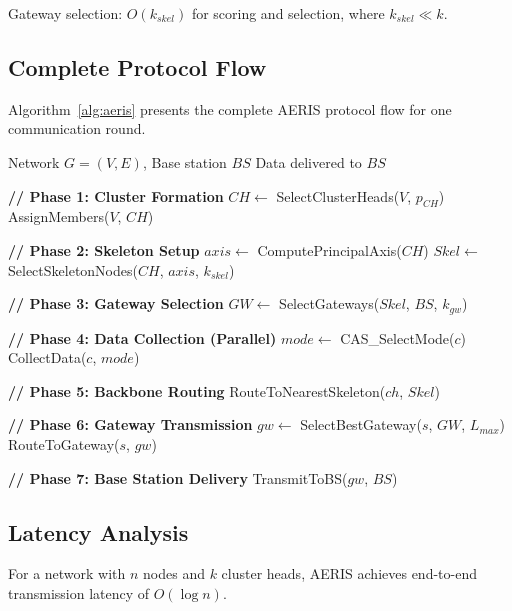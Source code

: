 Gateway selection: $O(k_{skel})$ for scoring and selection, where
$k_{skel} \ll k$.

\subsection{Complete Protocol Flow}

Algorithm~\ref{alg:aeris} presents the complete AERIS protocol flow
for one communication round.

\begin{algorithm}[htbp]
\caption{AERIS Protocol - One Round}
\label{alg:aeris}
\begin{algorithmic}[1]
\REQUIRE Network $G = (V, E)$, Base station $BS$
\ENSURE Data delivered to $BS$

\STATE \textbf{// Phase 1: Cluster Formation}
\STATE $CH \leftarrow$ SelectClusterHeads($V$, $p_{CH}$)
\STATE AssignMembers($V$, $CH$)

\STATE \textbf{// Phase 2: Skeleton Setup}
\STATE $axis \leftarrow$ ComputePrincipalAxis($CH$)
\STATE $Skel \leftarrow$ SelectSkeletonNodes($CH$, $axis$, $k_{skel}$)

\STATE \textbf{// Phase 3: Gateway Selection}
\STATE $GW \leftarrow$ SelectGateways($Skel$, $BS$, $k_{gw}$)

\STATE \textbf{// Phase 4: Data Collection (Parallel)}
    \STATE $mode \leftarrow$ CAS\_SelectMode($c$)
    \STATE CollectData($c$, $mode$)
\ENDFOR

\STATE \textbf{// Phase 5: Backbone Routing}
    \STATE RouteToNearestSkeleton($ch$, $Skel$)
\ENDFOR

\STATE \textbf{// Phase 6: Gateway Transmission}
    \STATE $gw \leftarrow$ SelectBestGateway($s$, $GW$, $L_{max}$)
    \STATE RouteToGateway($s$, $gw$)
\ENDFOR

\STATE \textbf{// Phase 7: Base Station Delivery}
    \STATE TransmitToBS($gw$, $BS$)
\ENDFOR

\end{algorithmic}
\end{algorithm}

\subsection{Latency Analysis}

\begin{theorem}
For a network with $n$ nodes and $k$ cluster heads, AERIS achieves
end-to-end transmission latency of $O(\log n)$.
\end{theorem}

